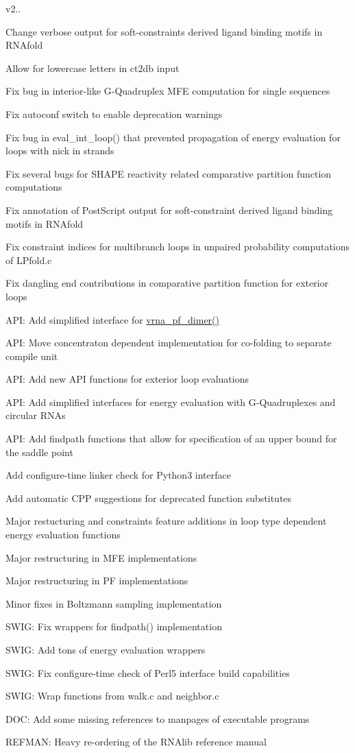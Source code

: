 v2..
\begin{DoxyItemize}
\item Change verbose output for soft-\/constraints derived ligand binding motifs in R\+N\+Afold
\item Allow for lowercase letters in ct2db input
\item Fix bug in interior-\/like G-\/\+Quadruplex M\+FE computation for single sequences
\item Fix autoconf switch to enable deprecation warnings
\item Fix bug in eval\+\_\+int\+\_\+loop() that prevented propagation of energy evaluation for loops with nick in strands
\item Fix several bugs for S\+H\+A\+PE reactivity related comparative partition function computations
\item Fix annotation of Post\+Script output for soft-\/constraint derived ligand binding motifs in R\+N\+Afold
\item Fix constraint indices for multibranch loops in unpaired probability computations of L\+Pfold.\+c
\item Fix dangling end contributions in comparative partition function for exterior loops
\item A\+PI\+: Add simplified interface for \hyperlink{group__pf__cofold_ga4e5c7d06c302a7c59fc0d64dc142ca63}{vrna\+\_\+pf\+\_\+dimer()}
\item A\+PI\+: Move concentraton dependent implementation for co-\/folding to separate compile unit
\item A\+PI\+: Add new A\+PI functions for exterior loop evaluations
\item A\+PI\+: Add simplified interfaces for energy evaluation with G-\/\+Quadruplexes and circular R\+N\+As
\item A\+PI\+: Add findpath functions that allow for specification of an upper bound for the saddle point
\item Add configure-\/time linker check for Python3 interface
\item Add automatic C\+PP suggestions for deprecated function substitutes
\item Major restucturing and constraints feature additions in loop type dependent energy evaluation functions
\item Major restructuring in M\+FE implementations
\item Major restructuring in PF implementations
\item Minor fixes in Boltzmann sampling implementation
\item S\+W\+IG\+: Fix wrappers for findpath() implementation
\item S\+W\+IG\+: Add tons of energy evaluation wrappers
\item S\+W\+IG\+: Fix configure-\/time check of Perl5 interface build capabilities
\item S\+W\+IG\+: Wrap functions from walk.\+c and neighbor.\+c
\item D\+OC\+: Add some missing references to manpages of executable programs
\item R\+E\+F\+M\+AN\+: Heavy re-\/ordering of the R\+N\+Alib reference manual
\end{DoxyItemize}

